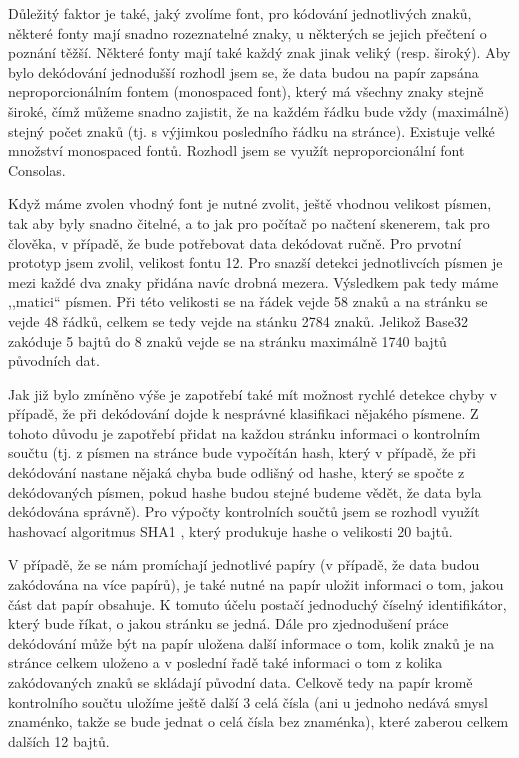 \documentclass[conference]{IEEEtran}
\begin{document}
Důležitý faktor je také, jaký zvolíme font, pro kódování jednotlivých znaků, některé fonty mají snadno rozeznatelné znaky, u některých se jejich přečtení o poznání těžší. Některé fonty mají také každý znak jinak veliký (resp. široký). Aby bylo dekódování jednodušší rozhodl jsem se, že data budou na papír zapsána neproporcionálním fontem \cite{Book:TheTypographicDeskReference} (monospaced font), který má všechny znaky stejně široké, čímž můžeme snadno zajistit, že na každém řádku bude vždy (maximálně) stejný počet znaků (tj. s výjimkou posledního řádku na stránce). Existuje velké množství monospaced fontů. Rozhodl jsem se využít neproporcionální font Consolas.

Když máme zvolen vhodný font je nutné zvolit, ještě vhodnou velikost písmen, tak aby byly snadno čitelné, a to jak pro počítač po načtení skenerem, tak pro člověka, v případě, že bude potřebovat data dekódovat ručně. Pro prvotní prototyp jsem zvolil, velikost fontu 12. Pro snazší detekci jednotlivcích písmen je mezi každé dva znaky přidána navíc drobná mezera. Výsledkem pak tedy máme ,,matici`` písmen. Při této velikosti se na řádek vejde 58 znaků a na stránku se vejde 48 řádků, celkem se tedy vejde na stánku 2784 znaků. Jelikož Base32 zakóduje 5 bajtů do 8 znaků vejde se na stránku maximálně 1740 bajtů původních dat.

Jak již bylo zmíněno výše je zapotřebí také mít možnost rychlé detekce chyby v případě, že při dekódování dojde k nesprávné klasifikaci nějakého písmene. Z tohoto důvodu je zapotřebí přidat na každou stránku informaci o kontrolním součtu (tj. z písmen na stránce bude vypočítán hash, který v případě, že při dekódování nastane nějaká chyba bude odlišný od hashe, který se spočte z dekódovaných písmen, pokud hashe budou stejné budeme vědět, že data byla dekódována správně). Pro výpočty kontrolních součtů jsem se rozhodl využít hashovací algoritmus SHA1 \cite{RFC3174}, který produkuje hashe o velikosti 20 bajtů.

V případě, že se nám promíchají jednotlivé papíry (v případě, že data budou zakódována na více papírů), je také nutné na papír uložit informaci o tom, jakou část dat papír obsahuje. K tomuto účelu postačí jednoduchý číselný identifikátor, který bude říkat, o jakou stránku se jedná. Dále pro zjednodušení práce dekódování může být na papír uložena další informace o tom, kolik znaků je na stránce celkem uloženo a v poslední řadě také informaci o tom z kolika zakódovaných znaků se skládají původní data. Celkově tedy na papír kromě kontrolního součtu uložíme ještě další 3 celá čísla (ani u jednoho nedává smysl znaménko, takže se bude jednat o celá čísla bez znaménka), které zaberou celkem dalších 12 bajtů. 
\end{document}
